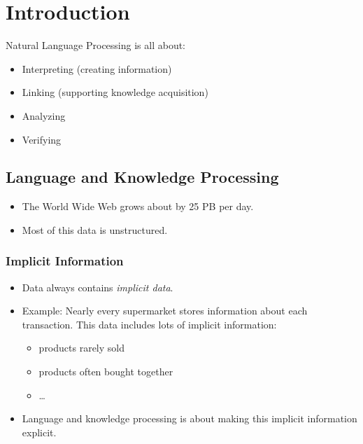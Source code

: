 \chapter{Introduction} %
	Natural Language Processing is all about:
	\begin{itemize}
		\item Interpreting (creating information)
		\item Linking (supporting knowledge acquisition)
		\item Analyzing
		\item Verifying
	\end{itemize}

    \section{Language and Knowledge Processing} %
    	\begin{itemize}
    		\item The World Wide Web grows about by 25 PB per day.
    		\item Most of this data is unstructured.
    	\end{itemize}

        \subsection{Implicit Information} %
            \begin{itemize}
            	\item Data always contains \textit{implicit data}.
            	\item Example: Nearly every supermarket stores information about each transaction. This data includes lots of implicit information:
            		\begin{itemize}
            			\item products rarely sold
            			\item products often bought together
            			\item \dots
            		\end{itemize}
            	\item Language and knowledge processing is about making this implicit information explicit.
            \end{itemize}


